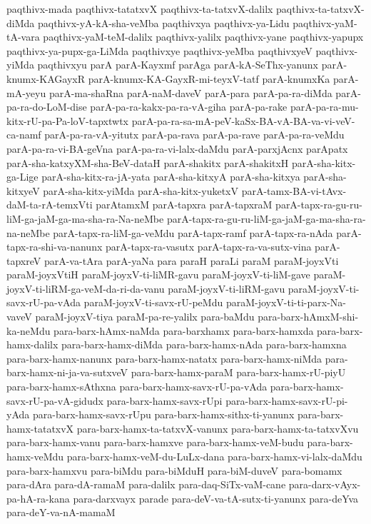 {paqthivx-mada
paqthivx-tatatxvX
paqthivx-ta-tatxvX-dalilx
paqthivx-ta-tatxvX-diMda
paqthivx-yA-kA-sha-veMba
paqthivxya
paqthivx-ya-Lidu
paqthivx-yaM-tA-vara
paqthivx-yaM-teM-dalilx
paqthivx-yalilx
paqthivx-yane
paqthivx-yapupx
paqthivx-ya-pupx-ga-LiMda
paqthivxye
paqthivx-yeMba
paqthivxyeV
paqthivx-yiMda
paqthivxyu
parA
parA-Kayxmf
parAga
parA-kA-SeThx-yanunx
parA-knumx-KAGayxR
parA-knumx-KA-GayxR-mi-teyxV-tatf
parA-knumxKa
parA-mA-yeyu
parA-ma-shaRna
parA-naM-daveV
parA-para
parA-pa-ra-diMda
parA-pa-ra-do-LoM-dise
parA-pa-ra-kakx-pa-ra-vA-giha
parA-pa-rake
parA-pa-ra-mu-kitx-rU-pa-Pa-loV-tapxtwtx
parA-pa-ra-sa-mA-peV-kaSx-BA-vA-BA-va-vi-veV-ca-namf
parA-pa-ra-vA-yitutx
parA-pa-rava
parA-pa-rave
parA-pa-ra-veMdu
parA-pa-ra-vi-BA-geVna
parA-pa-ra-vi-lalx-daMdu
parA-parxjAcnx
parApatx
parA-sha-katxyXM-sha-BeV-dataH
parA-shakitx
parA-shakitxH
parA-sha-kitx-ga-Lige
parA-sha-kitx-ra-jA-yata
parA-sha-kitxyA
parA-sha-kitxya
parA-sha-kitxyeV
parA-sha-kitx-yiMda
parA-sha-kitx-yuketxV
parA-tamx-BA-vi-tAvx-daM-ta-rA-temxVti
parAtamxM
parA-tapxra
parA-tapxraM
parA-tapx-ra-gu-ru-liM-ga-jaM-ga-ma-sha-ra-Na-neMbe
parA-tapx-ra-gu-ru-liM-ga-jaM-ga-ma-sha-ra-na-neMbe
parA-tapx-ra-liM-ga-veMdu
parA-tapx-ramf
parA-tapx-ra-nAda
parA-tapx-ra-shi-va-nanunx
parA-tapx-ra-vasutx
parA-tapx-ra-va-sutx-vina
parA-tapxreV
parA-va-tAra
parA-yaNa
para
paraH
paraLi
paraM
paraM-joyxVti
paraM-joyxVtiH
paraM-joyxV-ti-liMR-gavu
paraM-joyxV-ti-liM-gave
paraM-joyxV-ti-liRM-ga-veM-da-ri-da-vanu
paraM-joyxV-ti-liRM-gavu
paraM-joyxV-ti-savx-rU-pa-vAda
paraM-joyxV-ti-savx-rU-peMdu
paraM-joyxV-ti-ti-parx-Na-vaveV
paraM-joyxV-tiya
paraM-pa-re-yalilx
para-baMdu
para-barx-hAmxM-shi-ka-neMdu
para-barx-hAmx-naMda
para-barxhamx
para-barx-hamxda
para-barx-hamx-dalilx
para-barx-hamx-diMda
para-barx-hamx-nAda
para-barx-hamxna
para-barx-hamx-nanunx
para-barx-hamx-natatx
para-barx-hamx-niMda
para-barx-hamx-ni-ja-va-sutxveV
para-barx-hamx-paraM
para-barx-hamx-rU-piyU
para-barx-hamx-sAthxna
para-barx-hamx-savx-rU-pa-vAda
para-barx-hamx-savx-rU-pa-vA-gidudx
para-barx-hamx-savx-rUpi
para-barx-hamx-savx-rU-pi-yAda
para-barx-hamx-savx-rUpu
para-barx-hamx-sithx-ti-yanunx
para-barx-hamx-tatatxvX
para-barx-hamx-ta-tatxvX-vanunx
para-barx-hamx-ta-tatxvXvu
para-barx-hamx-vanu
para-barx-hamxve
para-barx-hamx-veM-budu
para-barx-hamx-veMdu
para-barx-hamx-veM-du-LuLx-dana
para-barx-hamx-vi-lalx-daMdu
para-barx-hamxvu
para-biMdu
para-biMduH
para-biM-duveV
para-bomamx
para-dAra
para-dA-ramaM
para-dalilx
para-daq-SiTx-vaM-cane
para-darx-vAyx-pa-hA-ra-kana
para-darxvayx
parade
para-deV-va-tA-sutx-ti-yanunx
para-deYva
para-deY-va-nA-mamaM
}
